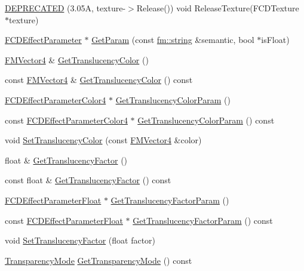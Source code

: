 \begin{DoxyCompactItemize}
\hyperlink{classFCDEffectStandard_a547dc3b97250d3143da3a42b21543400}{DEPRECATED} (3.05A, texture-\/$>$Release()) void ReleaseTexture(FCDTexture $\ast$texture)
\item 
\hyperlink{classFCDEffectParameter}{FCDEffectParameter} $\ast$ \hyperlink{classFCDEffectStandard_a8a74e967a857025c0ffa61d8acad7565}{GetParam} (const \hyperlink{classfm_1_1stringT}{fm::string} \&semantic, bool $\ast$isFloat)
\item 
\hyperlink{classFMVector4}{FMVector4} \& \hyperlink{classFCDEffectStandard_a0ccf7493649cc1870ca48cdde33f787e}{GetTranslucencyColor} ()
\item 
const \hyperlink{classFMVector4}{FMVector4} \& \hyperlink{classFCDEffectStandard_ac42d14b615f0c8a0c7e679204a5925c2}{GetTranslucencyColor} () const 
\item 
\hyperlink{classFCDEffectParameterAnimatableT}{FCDEffectParameterColor4} $\ast$ \hyperlink{classFCDEffectStandard_ae2ef3a8540d5dd7fef08b549b6af0ae0}{GetTranslucencyColorParam} ()
\item 
const \hyperlink{classFCDEffectParameterAnimatableT}{FCDEffectParameterColor4} $\ast$ \hyperlink{classFCDEffectStandard_aa31d56cb3ebb1096bc201daaa93c269c}{GetTranslucencyColorParam} () const 
\item 
void \hyperlink{classFCDEffectStandard_af3b24d8b85f4637f3bf7fa52ef578686}{SetTranslucencyColor} (const \hyperlink{classFMVector4}{FMVector4} \&color)
\item 
float \& \hyperlink{classFCDEffectStandard_affd222f5c17b3cd49e49eae5219ea1ec}{GetTranslucencyFactor} ()
\item 
const float \& \hyperlink{classFCDEffectStandard_ab89fda3928774321d1c95bebae1bb13d}{GetTranslucencyFactor} () const 
\item 
\hyperlink{classFCDEffectParameterAnimatableT}{FCDEffectParameterFloat} $\ast$ \hyperlink{classFCDEffectStandard_a30b06e8ef8177d59483926a70389e764}{GetTranslucencyFactorParam} ()
\item 
const \hyperlink{classFCDEffectParameterAnimatableT}{FCDEffectParameterFloat} $\ast$ \hyperlink{classFCDEffectStandard_ad18eefe810f554e294a1c90044905d28}{GetTranslucencyFactorParam} () const 
\item 
void \hyperlink{classFCDEffectStandard_a622c5a44ccfcecbb21bd7181d6653f82}{SetTranslucencyFactor} (float factor)
\item 
\hyperlink{classFCDEffectStandard_a9e749ea44e9152c5671985b3e9a7c9a5}{TransparencyMode} \hyperlink{classFCDEffectStandard_a986494286968251cd067be0bad9bc85a}{GetTransparencyMode} () const 

\end{DoxyCompactItemize}
